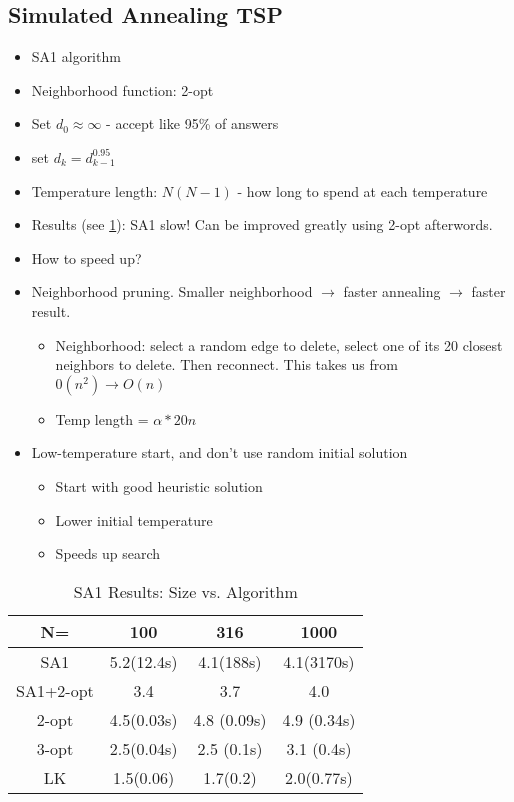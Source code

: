 \documentclass[12pt, letter]{article}
\begin{document}
\subsection*{Simulated Annealing TSP}
\begin{itemize}
    \item SA1 algorithm
    \item Neighborhood function: 2-opt
    \item Set $d_0 \approx \infty$ - accept like 95\% of answers
    \item set $d_k = d_{k-1}^{0.95}$ 
    \item Temperature length: $N(N-1)$ - how long to spend at each temperature
    \item Results (see \ref{tab:sa1}): SA1 slow! Can be improved greatly using 2-opt afterwords.
    \item How to speed up?
    \item Neighborhood pruning. Smaller neighborhood $\to$ faster annealing $\to$ faster result.
    \begin{itemize}
        \item Neighborhood: select a random edge to delete, select one of its 20 closest neighbors to delete. Then reconnect. This takes us from $0(n^2) \to O(n)$
        \item Temp length = $\alpha * 20n$
    \end{itemize}
    \item Low-temperature start, and don't use random initial solution
    \begin{itemize}
        \item Start with good heuristic solution
        \item Lower initial temperature
        \item Speeds up search
    \end{itemize}
\end{itemize}

\begin{table}[h]
    \centering
    \caption{SA1 Results: Size vs. Algorithm}
    \label{tab:sa1}
    \begin{tabular}{|c|c|c|c|}
    \hline
    N= & 100 & 316 & 1000 \\
    \hline
    SA1 & 5.2(12.4s) & 4.1(188s) & 4.1(3170s) \\
    \hline
    SA1+2-opt & 3.4 &  3.7 & 4.0 \\
    \hline
    2-opt & 4.5(0.03s) & 4.8  (0.09s) & 4.9 (0.34s) \\
    \hline
    3-opt & 2.5(0.04s) & 2.5 (0.1s) & 3.1 (0.4s) \\
    \hline
    LK & 1.5(0.06) & 1.7(0.2) & 2.0(0.77s) \\
    \hline
    \end{tabular}
\end{table}
\end{document}
